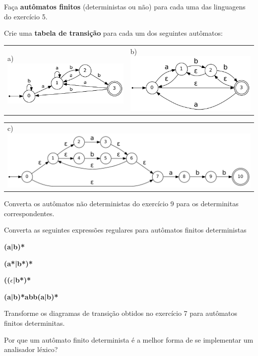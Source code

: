 \documentclass{compiladores}
\begin{document}
\begin{listanumerada}
\item
Faça {\bf autômatos finitos} (deterministas ou não) para cada uma das linguagens do exercício 5.

\item
Crie uma {\bf tabela de transição} para cada um dos seguintes autômatos: \\
\begin{tabularx}{\textwidth}{XX}
\centering
a) \includegraphics[width=.8\linewidth]{afd-1.pdf} &
b) \includegraphics[width=.8\linewidth]{afnd-1.pdf}
\end{tabularx}
\begin{tabularx}{\textwidth}{X}
\centering
c) \includegraphics[width=.8\linewidth]{afnd_exemplo_3-34.pdf}
\end{tabularx}

\item
Converta os autômatos não deterministas do exercício 9 para
os determinitas correspondentes.

\item Converta as seguintes expressões regulares para autômatos
  finitos deterministas
\begin{lista}
  \item {\bf (a|b)*}
  \item {\bf (a*|b*)*}
  \item {\bf (($\epsilon$|b*)*}
  \item {\bf (a|b)*abb(a|b)*}
\end{lista}

\item
Transforme os diagramas de transição obtidos no exercício 7 para autômatos finitos determinitas.

\item
Por que um autômato finito determinista é a melhor forma de se implementar um analisador léxico?

\end{listanumerada}
\end{document}

